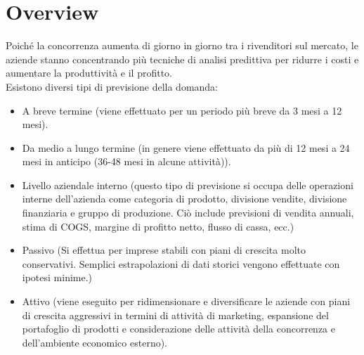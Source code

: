 \documentclass[12pt,a4paper]{report}
\begin{document}
\section{Overview}
Poiché la concorrenza aumenta di giorno in giorno tra i rivenditori sul mercato, le aziende stanno concentrando più tecniche di analisi predittiva per ridurre i costi e aumentare la produttività e il profitto.\\
Esistono diversi tipi di previsione della domanda:
\begin{itemize}
\item A breve termine (viene effettuato per un periodo più breve da 3 mesi a 12 mesi). 
\item Da medio a lungo termine (in genere viene effettuato da più di 12 mesi a 24 mesi in anticipo (36-48 mesi in alcune attività)).
\item Livello aziendale interno (questo tipo di previsione si occupa delle operazioni interne dell'azienda come categoria di prodotto, divisione vendite, divisione finanziaria e gruppo di produzione. Ciò include previsioni di vendita annuali, stima di COGS, margine di profitto netto, flusso di cassa, ecc.)
\item Passivo (Si effettua per imprese stabili con piani di crescita molto conservativi. Semplici estrapolazioni di dati storici vengono effettuate con ipotesi minime.)
\item Attivo (viene eseguito per ridimensionare e diversificare le aziende con piani di crescita aggressivi in termini di attività di marketing, espansione del portafoglio di prodotti e considerazione delle attività della concorrenza e dell'ambiente economico esterno).
\end{itemize}
\end{document}
